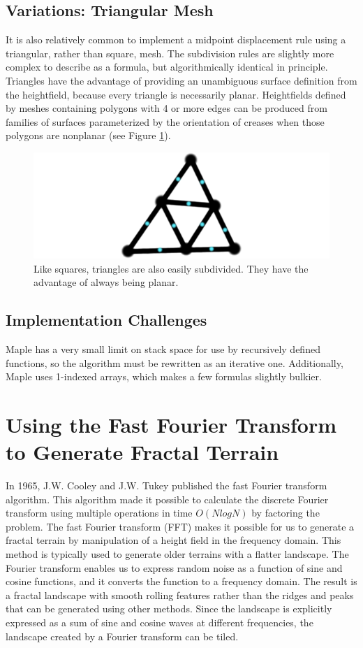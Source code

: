 \documentclass[11pt,twocolumn]{article}
\begin{document}
	\subsection{Variations: Triangular Mesh}
	It is also relatively common to implement a midpoint displacement rule using a triangular, rather than square, mesh.
	The subdivision rules are slightly more complex to describe as a formula, but algorithmically identical in principle.
	Triangles have the advantage of providing an unambiguous surface definition from the heightfield, because every triangle
	is necessarily planar. Heightfields defined by meshes containing polygons with 4 or more edges can be produced from families
	of surfaces parameterized by the orientation of creases when those polygons are nonplanar (see Figure \ref{fig:trimesh}).
	
	\begin{figure}[ht]
	\includegraphics[scale=0.3]{triangularmidpoint.png}
	\caption{Like squares, triangles are also easily subdivided. They have the advantage of always being planar.}
	\label{fig:trimesh}
	\end{figure}
  
	\subsection{Implementation Challenges}
	Maple has a very small limit on stack space for use by recursively defined functions, so the algorithm must be rewritten as an iterative one.
	Additionally, Maple uses 1-indexed arrays, which makes a few formulas slightly bulkier.

	\section{Using the Fast Fourier Transform to Generate Fractal Terrain} 
	\label{sec:FFT}
	In 1965, J.W. Cooley and J.W. Tukey published the fast Fourier transform algorithm.
	This algorithm made it possible to calculate the discrete Fourier transform using multiple operations
	in time $O(NlogN)$ by factoring the problem. The fast Fourier transform (FFT) makes it possible for us to generate a fractal terrain
	by manipulation of a height field in the frequency domain. This method is typically used to generate
	older terrains with a flatter landscape.
	The Fourier transform enables us to express random noise as a function of sine and cosine functions,
	and it converts the function to a frequency domain. The result is a fractal landscape with smooth rolling
	features rather than the ridges and peaks that can be generated using other methods. Since the landscape is
	explicitly expressed as a sum of sine and cosine waves at different frequencies, the landscape created by a
	Fourier transform can be tiled.
	
\end{document}
